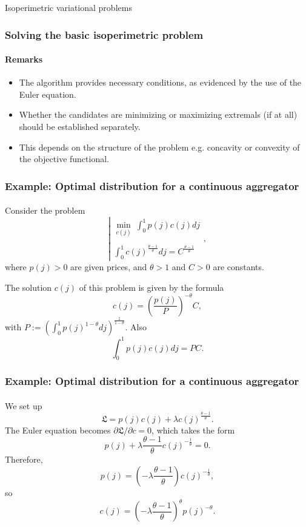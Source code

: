 \documentclass[10pt]{beamer}
\theoremstyle{definition}
\begin{document}
\begin{section}{Isoperimetric variational problems}
\begin{frame}[fragile]
\frametitle{Solving the basic isoperimetric problem}
\framesubtitle{Remarks}
\begin{itemize}
\item The algorithm provides necessary conditions, as evidenced by the use of the Euler equation.
\item Whether the candidates are minimizing or maximizing extremals (if at all) should be established separately.
\item This depends on the structure of the problem e.g. concavity or convexity of the objective functional.
\end{itemize}
\end{frame}

\begin{frame}[fragile]
\frametitle{Example: Optimal distribution for a continuous aggregator}
\framesubtitle{}
Consider the problem  \begin{equation*} 
\left| \begin{array}{l}
\min_{c(j)}~ \int_0^1 p(j) c(j) dj  \\{}\\
\int_0^1c(j)^{\frac{\theta-1}{\theta}}dj = C^{\frac{\theta-1}{\theta}}
\end{array} ,
\right.
\end{equation*} where $p(j)>0$ are given prices, and $\theta>1$ and $C>0$ are constants.\bigskip

The solution $c(j)$ of this problem is given by the formula \[ c(j)=\left( \frac{p(j) }{P} \right)^{-\theta} C, \] with $P := \left( \int_0^1 p(j)^{1-\theta}
dj \right)^{\frac{1}{1-\theta}}.$ Also \[ \int_0^1
p(j) c(j) dj = P C. \]
\end{frame}



\begin{frame}[fragile]
\frametitle{Example: Optimal distribution for a continuous aggregator}
\framesubtitle{}
We set up
\[ \mathfrak{L}=p(j)c(j)+\lambda
c(j)^{\frac{\theta-1}{\theta}}. \] The Euler equation becomes $\partial \mathfrak{L}/\partial c = 0$, which takes the form
\[ p(j)+ \lambda \frac{\theta-1}{\theta}
c(j)^{-\frac{1}{\theta}}=0. \]
Therefore, \[ p(j) = \left( -\lambda \frac{\theta-1}{\theta}
\right) c(j)^{-\frac{1}{\theta}}, \] so \begin{equation}\label{eq:AppxFOC1}
c(j) = \left( -\lambda
\frac{\theta-1}{\theta} \right)^\theta p(j)^{-\theta}.
\end{equation}
\end{frame}




\end{section}
\end{document}
